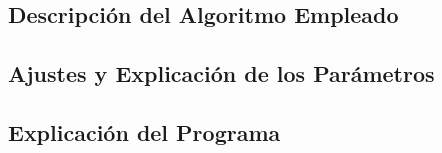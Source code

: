 \subsection{Descripción del Algoritmo Empleado}


\subsection{Ajustes y Explicación de los Parámetros}


\subsection{Explicación del Programa}

